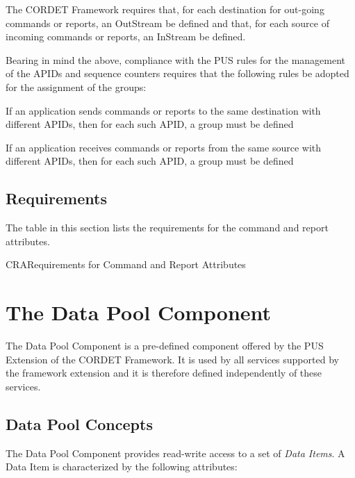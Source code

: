 \documentclass{pnp_article}
\begin{document}
The CORDET Framework requires that, for each destination for out-going commands or reports, an OutStream be defined and that, for each source of incoming commands or reports, an InStream be defined. 

Bearing in mind the above, compliance with the PUS rules for the management of the APIDs and sequence counters requires that the following rules be adopted for the assignment of the groups: 

\begin{fw_itemize}
\item If an application sends commands or reports to the same destination with different APIDs, then for each such APID, a group must be defined
\item If an application receives commands or reports from the same source  with different APIDs, then for each such APID, a group must be defined
\end{fw_itemize}


\newpage
\subsection{Requirements}
The table in this section lists the requirements for the command and report attributes.

\begin{cr_req}{CRA}{Requirements for Command and Report Attributes}
\end{cr_req}
 

\section{The Data Pool Component}\label{sec:dp}
The Data Pool Component is a pre-defined component offered by the PUS Extension of the CORDET Framework. It is used by all services supported by the framework extension and it is therefore defined independently of these services.

\subsection{Data Pool Concepts}\label{sec:dpConcepts}
The Data Pool Component provides read-write access to a set of \textit{Data Items}. A Data Item is characterized by the following attributes: 
\end{document}
